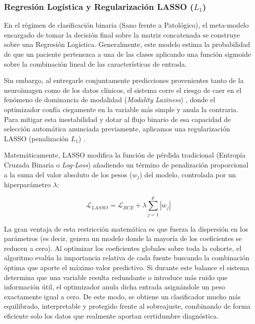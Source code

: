 \documentclass[12pt, oneside, english, spanish]{book}
\begin{document}
\subsubsection{Regresión Logística y Regularización LASSO ($L_1$)} \label{subsubsec:teoria_lasso_logistica}

En el régimen de clasificación binaria (Sano frente a Patológico), el meta-modelo encargado de tomar la decisión final sobre la matriz concatenada se construye sobre una Regresión Logística. Generalmente, este modelo estima la probabilidad de que un paciente pertenezca a una de las clases aplicando una función sigmoide sobre la combinación lineal de las características de entrada.

Sin embargo, al entregarle conjuntamente predicciones provenientes tanto de la neuroimagen como de los datos clínicos, el sistema corre el riesgo de caer en el fenómeno de dominancia de modalidad (\textit{Modality Laziness}) \cite{javaloy2022, wang2020makes}, donde el optimizador confía ciegamente en la variable más simple y anula la contraria. Para mitigar esta inestabilidad y dotar al flujo binario de esa capacidad de selección automática anunciada previamente, aplicamos una regularización LASSO (penalización $L_1$) \cite{tibshirani1996regression}.

Matemáticamente, LASSO modifica la función de pérdida tradicional (Entropía Cruzada Binaria o \textit{Log-Loss}) añadiendo un término de penalización proporcional a la suma del valor absoluto de los pesos ($w_j$) del modelo, controlada por un hiperparámetro $\lambda$:

\begin{equation}
	\mathcal{L}_{LASSO} = \mathcal{L}_{BCE} + \lambda \sum_{j=1}^{p} |w_j|
\end{equation}

La gran ventaja de esta restricción matemática es que fuerza la dispersión en los parámetros (es decir, genera un modelo donde la mayoría de los coeficientes se reducen a cero). Al optimizar los coeficientes globales sobre toda la cohorte, el algoritmo evalúa la importancia relativa de cada fuente buscando la combinación óptima que aporte el máximo valor predictivo. Si durante este balance el sistema determina que una variable resulta redundante o introduce más ruido que información útil, el optimizador anula dicha entrada asignándole un peso exactamente igual a cero. De este modo, se obtiene un clasificador mucho más equilibrado, interpretable y protegido frente al sobreajuste, combinando de forma eficiente solo los datos que realmente aportan certidumbre diagnóstica.
\end{document}
